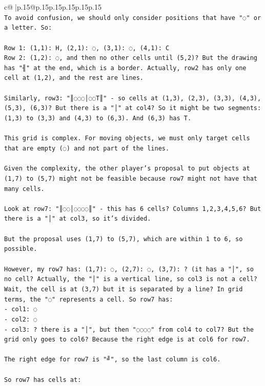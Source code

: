 \documentclass{article}
\begin{document}
{\begin{supertabular}{c@{$\;$}|p{.15\linewidth}@{}p{.15\linewidth}p{.15\linewidth}p{.15\linewidth}p{.15\linewidth}p{.15\linewidth}}
{{{\\ 
\texttt{To avoid confusion, we should only consider positions that have "◌" or a letter. So:} \\
\\ 
\texttt{Row 1: (1,1): H, (2,1): ◌, (3,1): ◌, (4,1): C} \\
\texttt{Row 2: (1,2): ◌, and then no other cells until (5,2)? But the drawing has "╢" at the end, which is a border. Actually, row2 has only one cell at (1,2), and the rest are lines.} \\
\\ 
\texttt{Similarly, row3: "║◌◌◌│◌◌T║" {-} so cells at (1,3), (2,3), (3,3), (4,3), (5,3), (6,3)? But there is a "│" at col4? So it might be two segments: (1,3) to (3,3) and (4,3) to (6,3). And (6,3) has T.} \\
\\ 
\texttt{This grid is complex. For moving objects, we must only target cells that are empty (◌) and not part of the lines.} \\
\\ 
\texttt{Given the complexity, the other player's proposal to put objects at (1,7) to (5,7) might not be feasible because row7 might not have that many cells.} \\
\\ 
\texttt{Look at row7: "║◌◌│◌◌◌◌║" {-} this has 6 cells? Columns 1,2,3,4,5,6? But there is a "│" at col3, so it's divided.} \\
\\ 
\texttt{But the proposal uses (1,7) to (5,7), which are within 1 to 6, so possible.} \\
\\ 
\texttt{However, my row7 has: (1,7): ◌, (2,7): ◌, (3,7): ? (it has a "│", so no cell? Actually, the "│" is a vertical line, so col3 is not a cell? Wait, the cell is at (3,7) but it is separated by a line? In grid terms, the "◌" represents a cell. So row7 has:} \\
\texttt{{-} col1: ◌} \\
\texttt{{-} col2: ◌} \\
\texttt{{-} col3: ? there is a "│", but then "◌◌◌◌" from col4 to col7? But the grid only goes to col6? Because the right edge is at col6 for row7.} \\
\\ 
\texttt{The right edge for row7 is "╝", so the last column is col6.} \\
\\ 
\texttt{So row7 has cells at:} \\
}}}
\end{supertabular}}
\end{document}
